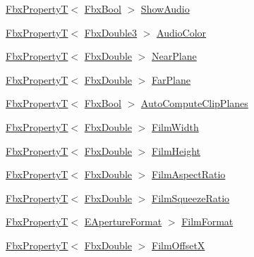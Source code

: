 \begin{DoxyCompactItemize}
\item 
\hyperlink{class_fbx_property_t}{Fbx\+PropertyT}$<$ \hyperlink{fbxtypes_8h_a92e0562b2fe33e76a242f498b362262e}{Fbx\+Bool} $>$ \hyperlink{class_fbx_camera_ad2c18755bf884d3ce15566dc90cc3d97}{Show\+Audio}
\item 
\hyperlink{class_fbx_property_t}{Fbx\+PropertyT}$<$ \hyperlink{fbxtypes_8h_ae0a96f14cde566774c7553aa7523b7a7}{Fbx\+Double3} $>$ \hyperlink{class_fbx_camera_a39719d29cec7526134a1856a8c8e1995}{Audio\+Color}
\item 
\hyperlink{class_fbx_property_t}{Fbx\+PropertyT}$<$ \hyperlink{fbxtypes_8h_a171e72a1c46fc15c1a6c9c31948c1c5b}{Fbx\+Double} $>$ \hyperlink{class_fbx_camera_adbca6c29099ceac39fb350201fb3163d}{Near\+Plane}
\item 
\hyperlink{class_fbx_property_t}{Fbx\+PropertyT}$<$ \hyperlink{fbxtypes_8h_a171e72a1c46fc15c1a6c9c31948c1c5b}{Fbx\+Double} $>$ \hyperlink{class_fbx_camera_a72de3e07e3d77face8a1412599facf73}{Far\+Plane}
\item 
\hyperlink{class_fbx_property_t}{Fbx\+PropertyT}$<$ \hyperlink{fbxtypes_8h_a92e0562b2fe33e76a242f498b362262e}{Fbx\+Bool} $>$ \hyperlink{class_fbx_camera_a416ffa14cbcdc07b2559bbbed7371d75}{Auto\+Compute\+Clip\+Planes}
\item 
\hyperlink{class_fbx_property_t}{Fbx\+PropertyT}$<$ \hyperlink{fbxtypes_8h_a171e72a1c46fc15c1a6c9c31948c1c5b}{Fbx\+Double} $>$ \hyperlink{class_fbx_camera_a54f69a2e295c3c69df559f9b64699be5}{Film\+Width}
\item 
\hyperlink{class_fbx_property_t}{Fbx\+PropertyT}$<$ \hyperlink{fbxtypes_8h_a171e72a1c46fc15c1a6c9c31948c1c5b}{Fbx\+Double} $>$ \hyperlink{class_fbx_camera_ae8e2abec912de996c4eaaff987a3bd17}{Film\+Height}
\item 
\hyperlink{class_fbx_property_t}{Fbx\+PropertyT}$<$ \hyperlink{fbxtypes_8h_a171e72a1c46fc15c1a6c9c31948c1c5b}{Fbx\+Double} $>$ \hyperlink{class_fbx_camera_aeefc9d0c4a6c9c3e17dc265cf2621a47}{Film\+Aspect\+Ratio}
\item 
\hyperlink{class_fbx_property_t}{Fbx\+PropertyT}$<$ \hyperlink{fbxtypes_8h_a171e72a1c46fc15c1a6c9c31948c1c5b}{Fbx\+Double} $>$ \hyperlink{class_fbx_camera_a21d8a100a10638aafdbf69304c651c48}{Film\+Squeeze\+Ratio}
\item 
\hyperlink{class_fbx_property_t}{Fbx\+PropertyT}$<$ \hyperlink{class_fbx_camera_ac26ac89602453c5917882c69d4863d13}{E\+Aperture\+Format} $>$ \hyperlink{class_fbx_camera_a49ebaef59ee49281225e2d0652894a4f}{Film\+Format}
\item 
\hyperlink{class_fbx_property_t}{Fbx\+PropertyT}$<$ \hyperlink{fbxtypes_8h_a171e72a1c46fc15c1a6c9c31948c1c5b}{Fbx\+Double} $>$ \hyperlink{class_fbx_camera_aa0a5e1ab510d4b87db69e8ed6febacc3}{Film\+OffsetX}

\end{DoxyCompactItemize}
